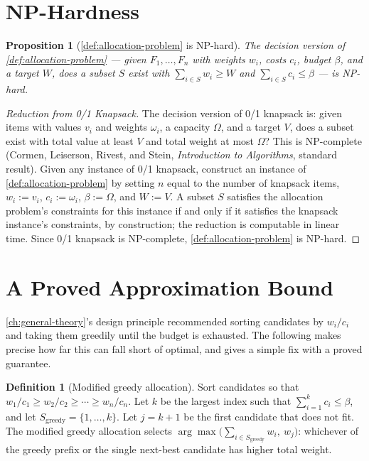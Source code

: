 \documentclass[11pt]{book}
\theoremstyle{plain}
\newtheorem{proposition}[theorem]{Proposition}
\theoremstyle{definition}
\newtheorem{definition}[theorem]{Definition}
\theoremstyle{remark}
\begin{document}
\section{NP-Hardness}

\begin{proposition}[\cref{def:allocation-problem} is NP-hard]
\label{app:prop-nphard}
The decision version of \cref{def:allocation-problem} --- given
$F_1,\dots,F_n$ with weights $w_i$, costs $c_i$, budget $\beta$, and a
target $W$, does a subset $S$ exist with $\sum_{i \in S} w_i \geq W$
and $\sum_{i \in S} c_i \leq \beta$ --- is NP-hard.
\end{proposition}

\begin{proof}[Reduction from 0/1 Knapsack]
The decision version of 0/1 knapsack is: given items with values
$v_i$ and weights $\omega_i$, a capacity $\Omega$, and a target $V$,
does a subset exist with total value at least $V$ and total weight at
most $\Omega$? This is NP-complete (Cormen, Leiserson, Rivest, and
Stein, \emph{Introduction to Algorithms}, standard result). Given any
instance of 0/1 knapsack, construct an instance of
\cref{def:allocation-problem} by setting $n$ equal to the number of
knapsack items, $w_i := v_i$, $c_i := \omega_i$, $\beta := \Omega$,
and $W := V$. A subset $S$ satisfies the allocation problem's
constraints for this instance if and only if it satisfies the
knapsack instance's constraints, by construction; the reduction is
computable in linear time. Since 0/1 knapsack is NP-complete,
\cref{def:allocation-problem} is NP-hard.
\end{proof}

\section{A Proved Approximation Bound}

\cref{ch:general-theory}'s design principle recommended sorting
candidates by $w_i / c_i$ and taking them greedily until the budget is
exhausted. The following makes precise how far this can fall short of
optimal, and gives a simple fix with a proved guarantee.

\begin{definition}[Modified greedy allocation]
\label{app:def-modified-greedy}
Sort candidates so that $w_1/c_1 \geq w_2/c_2 \geq \cdots \geq
w_n/c_n$. Let $k$ be the largest index such that $\sum_{i=1}^{k} c_i
\leq \beta$, and let $S_{\mathrm{greedy}} = \{1,\dots,k\}$. Let $j =
k+1$ be the first candidate that does not fit. The modified greedy
allocation selects $\arg\max\bigl(\textstyle\sum_{i \in
S_{\mathrm{greedy}}} w_i,\ w_j\bigr)$: whichever of the greedy prefix or
the single next-best candidate has higher total weight.
\end{definition}
\end{document}
